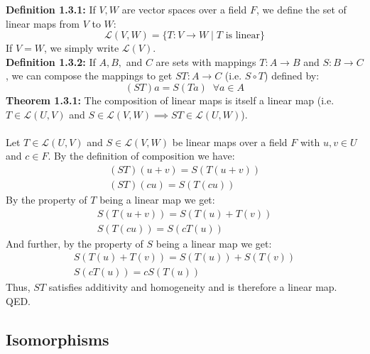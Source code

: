 \documentclass[11pt]{article}
\begin{document}
\textbf{Definition 1.3.1:} If $V, W$ are vector spaces over a field $F$, we define the set of linear maps from $V$ to $W$:
\begin{equation*}
    \mathcal{L}(V,W) = \{T : V \rightarrow W \; | \; T \text{ is linear}\}
\end{equation*}
If $V = W$, we simply write $\mathcal{L}(V)$. \\
\textbf{Definition 1.3.2:} If $A, B,$ and $C$ are sets with mappings $T : A \rightarrow B$ and $S : B \rightarrow C$, we can compose the mappings to get $ST : A \rightarrow C$ (i.e. $S \circ T$) defined by:
\begin{equation*}
    (ST)a = S(Ta) \;\; \forall a \in A
\end{equation*}
\textbf{Theorem 1.3.1:} The composition of linear maps is itself a linear map (i.e. $T \in \mathcal{L}(U,V)$ and $S \in \mathcal{L}(V,W) \implies ST \in \mathcal{L}(U,W)$). \\
\vspace{0.1cm} \\
Let $T \in \mathcal{L}(U,V)$ and $S \in \mathcal{L}(V,W)$ be linear maps over a field $F$ with $u,v \in U$ and $c \in F$. By the definition of composition we have:
\begin{gather*}
    (ST)(u + v) = S(T(u + v)) \\
    (ST)(cu) =  S(T(cu))
\end{gather*}
By the property of $T$ being a linear map we get:
\begin{gather*}
    S(T(u + v)) = S(T(u) + T(v)) \\
    S(T(cu)) = S(cT(u))
\end{gather*}
And further, by the property of $S$ being a linear map we get:
\begin{gather*}
    S(T(u) + T(v)) = S(T(u)) + S(T(v)) \\
    S(cT(u)) = cS(T(u))
\end{gather*}
Thus, $ST$ satisfies additivity and homogeneity and is therefore a linear map. QED.

\subsection{Isomorphisms}
\end{document}
